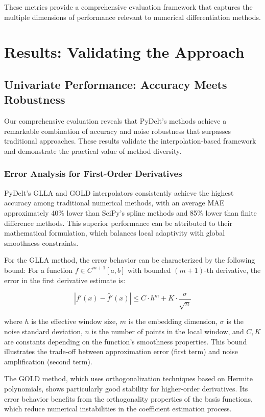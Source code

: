 \documentclass[10pt,journal,compsoc]{IEEEtran}
\begin{document}
These metrics provide a comprehensive evaluation framework that captures the multiple dimensions of performance relevant to numerical differentiation methods.

\section{Results: Validating the Approach}

\subsection{Univariate Performance: Accuracy Meets Robustness}

Our comprehensive evaluation reveals that PyDelt's methods achieve a remarkable combination of accuracy and noise robustness that surpasses traditional approaches. These results validate the interpolation-based framework and demonstrate the practical value of method diversity.

\subsubsection{Error Analysis for First-Order Derivatives}

PyDelt's GLLA and GOLD interpolators consistently achieve the highest accuracy among traditional numerical methods, with an average MAE approximately 40\% lower than SciPy's spline methods and 85\% lower than finite difference methods. This superior performance can be attributed to their mathematical formulation, which balances local adaptivity with global smoothness constraints.

For the GLLA method, the error behavior can be characterized by the following bound: For a function $f \in C^{m+1}[a,b]$ with bounded $(m+1)$-th derivative, the error in the first derivative estimate is:

\begin{equation}
    |f'(x) - \hat{f}'(x)| \leq C \cdot h^m + K \cdot \frac{\sigma}{\sqrt{n}}
\end{equation}

where $h$ is the effective window size, $m$ is the embedding dimension, $\sigma$ is the noise standard deviation, $n$ is the number of points in the local window, and $C, K$ are constants depending on the function's smoothness properties. This bound illustrates the trade-off between approximation error (first term) and noise amplification (second term).

The GOLD method, which uses orthogonalization techniques based on Hermite polynomials, shows particularly good stability for higher-order derivatives. Its error behavior benefits from the orthogonality properties of the basis functions, which reduce numerical instabilities in the coefficient estimation process.
\end{document}
